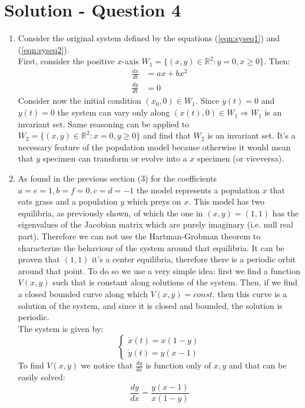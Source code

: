 \section*{Solution - Question 4}
\begin{enumerate}
\item{
Consider the original system defined by the equations (\ref{eqn:syseq1}) and (\ref{eqn:syseq2}).\\
First, consider the positive $x$-axis $W_1 =\{ (x,y) \in \mathbb{R}^2 : y=0, x \geq 0\}$. Then:
\begin{align*}
    \frac{d x}{dt} & = ax+bx^2  \\
    \frac{d y}{dt} & = 0 
\end{align*}
Consider now the initial condition $(x_0,0) \in W_1$. Since $\dot{y}(t)=0$ and $y(t)=0$ the system can vary only along $(x(t),0) \in W_1 \Rightarrow W_1$ is an invariant set. Same reasoning can be applied to $W_2 =\{ (x,y) \in \mathbb{R}^2 : x=0, y \geq 0\}$ and find that $W_2$ is an invariant set.
It's a necessary feature of the population model because otherwise it would mean that  $y$ specimen can transform or evolve into a $x$ specimen (or viceversa).}
\item {As found in the previous section (3) for the coefficients $a=e=1,b=f=0,c=d=-1$ the model represents a population $x$ that eats grass and a population $y$ which preys on $x$. This model has two equilibria, as previously shown, of which the one in $(x,y)=(1,1)$ has the eigenvalues of the Jacobian matrix which are purely imaginary (i.e. null real part). Therefore we can not use the Hartman-Grobman theorem to characterize the behaviour of the system around that equilibria. It can be proven that $(1,1)$ it's a center equilibria, therefore there is a periodic orbit around that point. 
To do so we use a very simple idea: first we find a function $V(x,y)$ such that is constant along solutions of the system. Then, if we find a closed bounded curve along which $V(x,y)=const.$ then this curve is a solution of the system, and since it is closed and bounded, the solution is periodic.
\\The system is given by:
$$
    \left\{\begin{aligned} 
      \dot{x}(t) = x(1-y) \\
      \dot{y}(t) = y(x-1)
    \end{aligned}\right.
$$
To find $V(x,y)$ we notice that $\frac{dy}{dx}$ is function only of $x,y$ and that can be easily solved: 
$$\frac{dy}{dx} = \frac{y(x-1)}{x(1-y)}$$
}
\end{enumerate}
